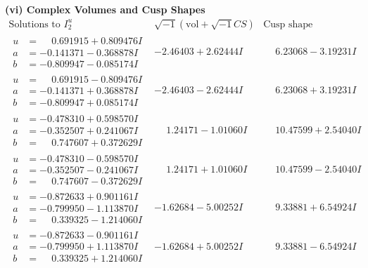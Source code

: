 \documentclass[1p]{elsarticle_modified}
\theoremstyle{definition}
\newcommand{\I}{\sqrt{-1}}
\begin{document}
\newpage\flushleft \textbf{(vi) Complex Volumes and Cusp Shapes}
$$\begin{array}{c|c|c}  
\text{Solutions to }I^u_{2}& \I (\text{vol} + \sqrt{-1}CS) & \text{Cusp shape}\\
 \hline 
\begin{aligned}
u &= \phantom{-}0.691915 + 0.809476 I \\
a &= -0.141371 - 0.368878 I \\
b &= -0.809947 - 0.085174 I\end{aligned}
 & -2.46403 + 2.62444 I & \phantom{-}6.23068 - 3.19231 I \\ \hline\begin{aligned}
u &= \phantom{-}0.691915 - 0.809476 I \\
a &= -0.141371 + 0.368878 I \\
b &= -0.809947 + 0.085174 I\end{aligned}
 & -2.46403 - 2.62444 I & \phantom{-}6.23068 + 3.19231 I \\ \hline\begin{aligned}
u &= -0.478310 + 0.598570 I \\
a &= -0.352507 + 0.241067 I \\
b &= \phantom{-}0.747607 + 0.372629 I\end{aligned}
 & \phantom{-}1.24171 - 1.01060 I & \phantom{-}10.47599 + 2.54040 I \\ \hline\begin{aligned}
u &= -0.478310 - 0.598570 I \\
a &= -0.352507 - 0.241067 I \\
b &= \phantom{-}0.747607 - 0.372629 I\end{aligned}
 & \phantom{-}1.24171 + 1.01060 I & \phantom{-}10.47599 - 2.54040 I \\ \hline\begin{aligned}
u &= -0.872633 + 0.901161 I \\
a &= -0.799950 - 1.113870 I \\
b &= \phantom{-}0.339325 - 1.214060 I\end{aligned}
 & -1.62684 - 5.00252 I & \phantom{-}9.33881 + 6.54924 I \\ \hline\begin{aligned}
u &= -0.872633 - 0.901161 I \\
a &= -0.799950 + 1.113870 I \\
b &= \phantom{-}0.339325 + 1.214060 I\end{aligned}
 & -1.62684 + 5.00252 I & \phantom{-}9.33881 - 6.54924 I \\ \hline\begin{aligned}

\end{aligned}
\end{array}$$
\end{document}
